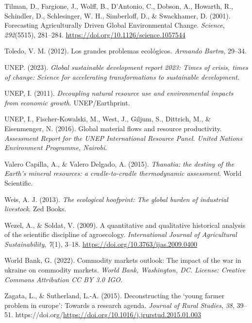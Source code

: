 \documentclass[a4paper, nobind]{templates/ociamthesis}
\newlength{\cslhangindent}
\newenvironment{CSLReferences}[2] %
 {%
  \setlength{\parindent}{0pt}
  \ifodd #1
  \let\oldpar\par
  \def\par{\hangindent=\cslhangindent\oldpar}
  \fi
  \setlength{\parskip}{1mm}
  \setlength{\baselineskip}{6mm}
 }%
 {}
\begin{document}
\begin{CSLReferences}{1}{0}
\leavevmode{}%
Tilman, D., Fargione, J., Wolff, B., D'Antonio, C., Dobson, A., Howarth, R., Schindler, D., Schlesinger, W. H., Simberloff, D., \& Swackhamer, D. (2001). Forecasting Agriculturally Driven Global Environmental Change. \emph{Science}, \emph{292}(5515), 281--284. \url{https://doi.org/10.1126/science.1057544}

\leavevmode{}%
Toledo, V. M. (2012). Los grandes problemas ecol{ó}gicos. \emph{Armando Bartra}, 29--34.

\leavevmode{}%
UNEP. (2023). \emph{Global sustainable development report 2023: Times of crisis, times of change: Science for accelerating transformations to sustainable development.}

\leavevmode{}%
UNEP, I. (2011). \emph{Decoupling natural resource use and environmental impacts from economic growth}. UNEP/Earthprint.

\leavevmode{}%
UNEP, I., Fischer-Kowalski, M., West, J., Giljum, S., Dittrich, M., \& Eisenmenger, N. (2016). Global material flows and resource productivity. \emph{Assessment Report for the UNEP International Resource Panel. United Nations Environment Programme, Nairobi}.

\leavevmode{}%
Valero Capilla, A., \& Valero Delgado, A. (2015). \emph{Thanatia: the destiny of the Earth's mineral resources: a cradle-to-cradle thermodynamic assessment}. World Scientific.

\leavevmode{}%
Weis, A. J. (2013). \emph{The ecological hoofprint: The global burden of industrial livestock}. Zed Books.

\leavevmode{}%
Wezel, A., \& Soldat, V. (2009). A quantitative and qualitative historical analysis of the scientific discipline of agroecology. \emph{International Journal of Agricultural Sustainability}, \emph{7}(1), 3--18. \url{https://doi.org/10.3763/ijas.2009.0400}

\leavevmode{}%
World Bank, G. (2022). Commodity markets outlook: The impact of the war in ukraine on commodity markets. \emph{World Bank, Washington, DC. License: Creative Commons Attribution CC BY 3.0 IGO.}

\leavevmode{}%
Zagata, L., \& Sutherland, L.-A. (2015). Deconstructing the {`}young farmer problem in europe{'}: Towards a research agenda. \emph{Journal of Rural Studies}, \emph{38}, 39--51. https://doi.org/\url{https://doi.org/10.1016/j.jrurstud.2015.01.003}

\end{CSLReferences}


\nocite{*}
\end{document}
